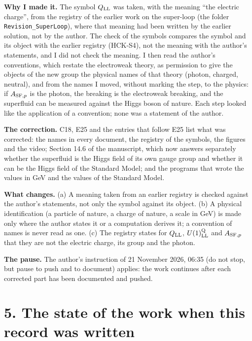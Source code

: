 \documentclass[
  10pt,
]{article}
\begin{document}
\textbf{Why I made it.} The symbol \(Q_{\rm LL}\) was taken, with the
meaning ``the electric charge'', from the registry of the earlier work
on the super-loop (the folder \texttt{Revision\_SuperLoop}), where that
meaning had been written by the earlier solution, not by the author. The
check of the symbols compares the symbol and its object with the earlier
registry (HCK-S4), not the meaning with the author's statements, and I
did not check the meaning. I then read the author's conventions, which
restate the electroweak theory, as permission to give the objects of the
new group the physical names of that theory (photon, charged, neutral),
and from the names I moved, without marking the step, to the physics: if
\(A_{{\rm SF},p}\) is the photon, the breaking is the electroweak
breaking, and the superfluid can be measured against the Higgs boson of
nature. Each step looked like the application of a convention; none was
a statement of the author.

\textbf{The correction.} C18, E25 and the entries that follow E25 list
what was corrected: the names in every document, the registry of the
symbols, the figures and the video; Section 14.6 of the manuscript,
which now answers separately whether the superfluid is the Higgs field
of its own gauge group and whether it can be the Higgs field of the
Standard Model; and the programs that wrote the values in GeV and the
values of the Standard Model.

\textbf{What changes.} (a) A meaning taken from an earlier registry is
checked against the author's statements, not only the symbol against its
object. (b) A physical identification (a particle of nature, a charge of
nature, a scale in GeV) is made only where the author states it or a
computation derives it; a convention of names is never read as one. (c)
The registry states for \(Q_{\rm LL}\), \(U(1)^{\rm Q}_{\rm LL}\) and
\(A_{{\rm SF},p}\) that they are not the electric charge, its group and
the photon.

\textbf{The pause.} The author's instruction of 21 November 2026, 06:35
(do not stop, but pause to push and to document) applies: the work
continues after each corrected part has been documented and pushed.

\hypertarget{the-state-of-the-work-when-this-record-was-written}{%
\section{5. The state of the work when this record was
written}\label{the-state-of-the-work-when-this-record-was-written}}
\end{document}

